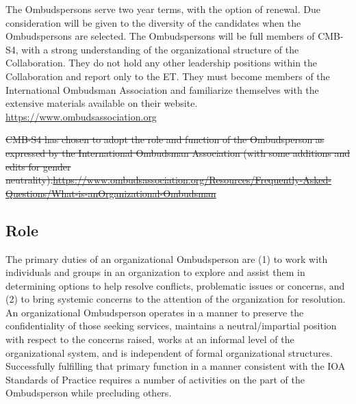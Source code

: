 \documentclass[12pt]{article}
\newcommand{\exec}{{Executive Team}}
\newcommand{\shorte}{{ET}}  %
\begin{document}
The Ombudspersons serve two year terms, with the option of renewal. Due consideration will be given to the diversity of the candidates when the Ombudspersons are selected. The Ombudspersons will be full members of CMB-S4, with a strong understanding of the organizational structure of the Collaboration. They do not hold any other leadership positions within the Collaboration and report only to the \shorte. They must become members of the International Ombudsman Association and familiarize themselves with the extensive materials available on their website. \url{https://www.ombudsassociation.org}

{\color{red} \sout{CMB-S4  has chosen to adopt the role and function of the Ombudsperson as expressed by the International Ombudsman Association (with some additions and edits for gender neutrality):\url{https://www.ombudsassociation.org/Resources/Frequently-Asked-Questions/What-is-anOrganizational-Ombudsman}}}

\subsection{Role}

The primary duties of an organizational Ombudsperson are (1) to work with individuals and groups in an organization to explore and assist them in determining options to help resolve conflicts, problematic issues or concerns, and (2) to bring systemic concerns to the attention of the organization for resolution. An organizational Ombudsperson operates in a manner to preserve the confidentiality of those seeking services, maintains a neutral/impartial position with respect to the concerns raised, works at an informal level of the organizational system, and is independent of formal organizational structures. Successfully fulfilling that primary function in a manner consistent with the IOA Standards of Practice requires a number of activities on the part of the Ombudsperson while precluding others.
\end{document}
